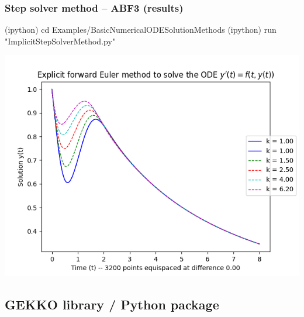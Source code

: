 \documentclass[usenames,svgnames,dvipsnames,10pt]{beamer}
\begin{document}
\begin{frame}[fragile]
\frametitle{Step solver method -- ABF3 (results)}

\begin{center}
\begin{code}
(ipython) cd Examples/BasicNumericalODESolutionMethods
(ipython) run "ImplicitStepSolverMethod.py"
\end{code}
\vskip -0.205cm
\includegraphics[height=0.76\textheight]{../Images/ABF3MultistepMethodResults-v2.png}
\end{center}

\end{frame}

\subsection{GEKKO library / Python package} 
\end{document}
